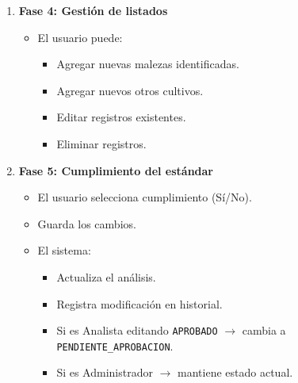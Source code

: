 \begin{enumerate}[nosep]
\begin{itemize}[nosep]
        \begin{itemize}[nosep]
            \item Fecha INASE.
            \item Porcentajes oficiales INASE.
        \end{itemize}
    \end{itemize}
    \item \textbf{Fase 4: Gestión de listados}
    \begin{itemize}[nosep]
        \item El usuario puede:
        \begin{itemize}[nosep]
            \item Agregar nuevas malezas identificadas.
            \item Agregar nuevos otros cultivos.
            \item Editar registros existentes.
            \item Eliminar registros.
        \end{itemize}
    \end{itemize}
    \item \textbf{Fase 5: Cumplimiento del estándar}
    \begin{itemize}[nosep]
        \item El usuario selecciona cumplimiento (Sí/No).
        \item Guarda los cambios.
        \item El sistema:
        \begin{itemize}[nosep]
            \item Actualiza el análisis.
            \item Registra modificación en historial.
            \item Si es Analista editando \texttt{APROBADO} $\rightarrow$ cambia a \texttt{PENDIENTE\_APROBACION}.
            \item Si es Administrador $\rightarrow$ mantiene estado actual.
        \end{itemize}
    \end{itemize}
\end{enumerate}

